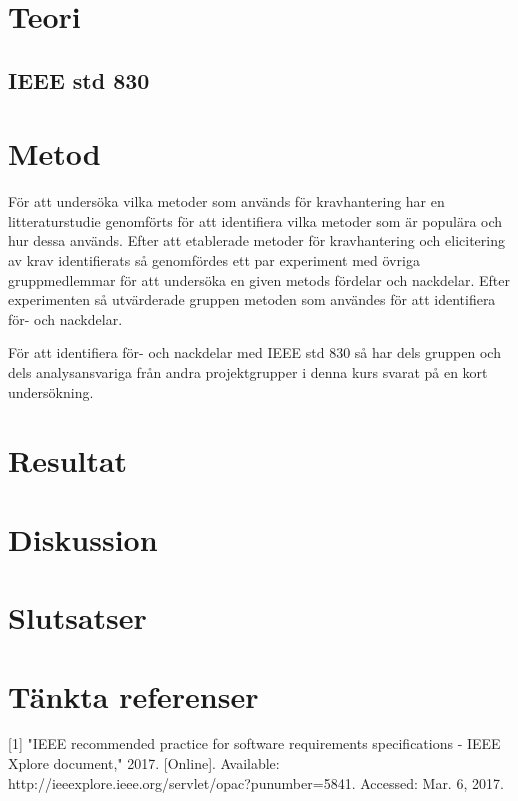\section{Teori}
\label{sec:theory-jannering}
\subsection{IEEE std 830}

\section{Metod}
\label{sec:method-jannering}

För att undersöka vilka metoder som används för kravhantering har en litteraturstudie genomförts för att identifiera vilka metoder som är populära och hur dessa används. Efter att etablerade metoder för kravhantering och elicitering av krav identifierats så genomfördes ett par experiment med övriga gruppmedlemmar för att undersöka en given metods fördelar och nackdelar. Efter experimenten så utvärderade gruppen metoden som användes för att identifiera för- och nackdelar. 

För att identifiera för- och nackdelar med IEEE std 830 \cite{ieee1998ieee} så har dels gruppen och dels analysansvariga från andra projektgrupper i denna kurs svarat på en kort undersökning.


\section{Resultat}
\label{sec:results-jannering}


\section{Diskussion}
\label{sec:discussion-jannering}


\section{Slutsatser}
\label{sec:conclusions-jannering}


\section{Tänkta referenser}
[1]  "IEEE recommended practice for software requirements specifications - IEEE Xplore document," 2017. [Online]. Available: http://ieeexplore.ieee.org/servlet/opac?punumber=5841. Accessed: Mar. 6, 2017.

